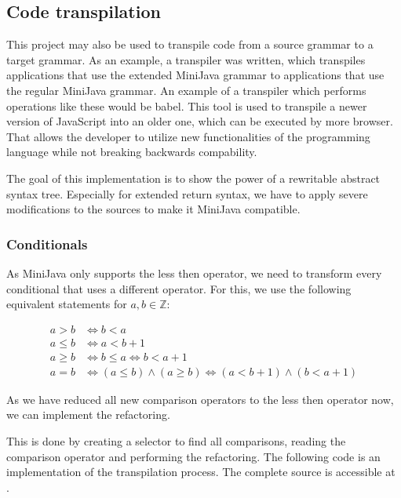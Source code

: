 
\subsection{Code transpilation}

This project may also be used to transpile code from a source grammar to a target grammar. 
As an example, a transpiler was written, which transpiles applications that use
the extended MiniJava grammar to applications that use the regular MiniJava grammar. 
An example of a transpiler which performs operations like these would be babel. This tool is
used to transpile a newer version of JavaScript into an older one, which can be executed by more browser. 
That allows the developer to utilize new functionalities of the programming language while not breaking backwards compability.

The goal of this implementation is to show the power of a rewritable abstract syntax tree. 
Especially for extended return syntax, we have to apply severe modifications to the sources
to make it MiniJava compatible.

\subsubsection{Conditionals}

As MiniJava only supports the less then operator, we need to transform every conditional that uses a different operator.
For this, we use the following equivalent statements for $a, b \in \mathbb{Z}$:

\begin{align}
    a > b  &\Longleftrightarrow b < a\\
    a \leq b  &\Longleftrightarrow a < b + 1\\
    a \geq b  &\Longleftrightarrow b \leq a \Longleftrightarrow b < a + 1\\
    a = b  &\Longleftrightarrow (a \leq b) \land (a \geq b) \Longleftrightarrow (a < b + 1) \land (b < a+ 1)
\end{align}

As we have reduced all new comparison operators to the less then operator now, we can implement the refactoring.

This is done by creating a selector to find all comparisons, reading the comparison operator and performing the refactoring.
The following code is an implementation of the transpilation process. The complete source is accessible at \cite{extended_mjava_transformation}.

